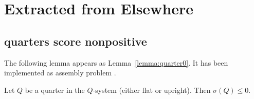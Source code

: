 \section{Extracted from Elsewhere}

\subsection{quarters score nonpositive}

The following lemma appears as Lemma~\ref{lemma:quarter0}.
It has been implemented as assembly problem .


\begin{lemma}\label{lemma:quarter0}
Let $Q$ be a quarter in the $Q$-system (either flat or upright).
Then $\sigma(Q)\le 0$. 
\end{lemma}


